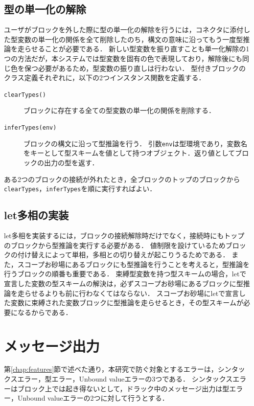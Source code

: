 \subsection*{型の単一化の解除}
ユーザがブロックを外した際に型の単一化の解除を行うには，コネクタに添付した型変数の単一化の関係を全て削除したのち，構文の意味に沿ってもう一度型推論を走らせることが必要である．
新しい型変数を振り直すことも単一化解除の1つの方法だが，本システムでは型変数を固有の色で表現しており，解除後にも同じ色を保つ必要があるため，型変数の振り直しは行わない．
型付きブロックのクラス定義それぞれに，以下の2つインスタンス関数を定義する．
\begin{description}
 \item[{\tt clearTypes()}] ブロックに存在する全ての型変数の単一化の関係を削除する．
 \item[{\tt inferTypes(env)}] ブロックの構文に沿って型推論を行う．
引数{\tt env}は型環境であり，変数名をキーとして型スキームを値として持つオブジェクト．返り値としてブロックの出力の型を返す．
\end{description}

ある2つのブロックの接続が外れたとき，全ブロックのトップのブロックから{\tt clearTypes}，{\tt inferTypes}を順に実行すればよい．

\subsection*{let多相の実装} %
let多相を実装するには，ブロックの接続解除時だけでなく，接続時にもトップのブロックから型推論を実行する必要がある．
値制限を設けているためブロックの付け替えによって単相，多相との切り替えが起こりうるためである．
また，スコープお砂場にあるブロックにも型推論を行うことを考えると，型推論を行うブロックの順番も重要である．
束縛型変数を持つ型スキームの場合，letで宣言した変数の型スキームの解決は，必ずスコープお砂場にあるブロックに型推論を走らせるよりも前に行わなくてはならない．
スコープお砂場にletで宣言した変数に束縛された変数ブロックに型推論を走らせるとき，その型スキームが必要になるからである．

\section {メッセージ出力}

第\ref{chap:features}節で述べた通り，本研究で防ぐ対象とするエラーは，シンタックスエラー，型エラー，Unbound valueエラーの3つである．
シンタックスエラーはブロック上では起き得ないとして，ドラック中のメッセージ出力は型エラー，Unbound valueエラーの2つに対して行うとする．

